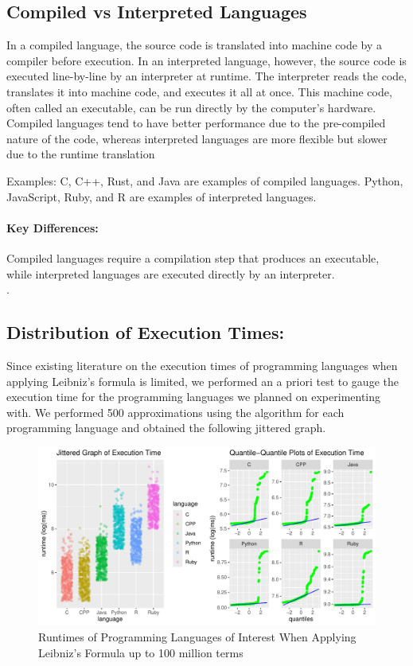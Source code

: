\documentclass[12pt,halfline,a4paper,]{ouparticle}
\begin{document}
\subsection{Compiled vs Interpreted
Languages}\label{compiled-vs-interpreted-languages}

In a compiled language, the source code is translated into machine code
by a compiler before execution. In an interpreted language, however, the
source code is executed line-by-line by an interpreter at runtime. The
interpreter reads the code, translates it into machine code, and
executes it all at once. This machine code, often called an executable,
can be run directly by the computer's hardware. Compiled languages tend
to have better performance due to the pre-compiled nature of the code,
whereas interpreted languages are more flexible but slower due to the
runtime translation

Examples: C, C++, Rust, and Java are examples of compiled languages.
Python, JavaScript, Ruby, and R are examples of interpreted languages.

\paragraph{Key Differences:}\label{key-differences}

Compiled languages require a compilation step that produces an
executable, while interpreted languages are executed directly by an
interpreter.\\
.

\subsection{Distribution of Execution
Times:}\label{distribution-of-execution-times}

Since existing literature on the execution times of programming
languages when applying Leibniz's formula is limited, we performed an a
priori test to gauge the execution time for the programming languages we
planned on experimenting with. We performed 500 approximations using the
algorithm for each programming language and obtained the following
jittered graph.

\begin{figure}[H]
\includegraphics[width=1\linewidth]{skeleton_files/figure-latex/figPrior-1} \caption{Runtimes of Programming Languages of Interest When Applying Leibniz's Formula up to 100 million terms}\label{fig:figPrior}
\end{figure}
\end{document}
